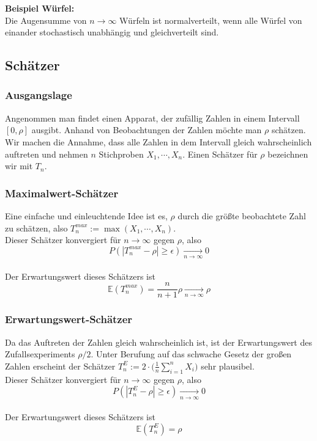\documentclass[a4paper]{article}
\begin{document}
\textbf{Beispiel Würfel:}\\
Die Augensumme von $n \to \infty$ Würfeln ist normalverteilt, wenn alle Würfel von einander stochastisch unabhängig und gleichverteilt sind.

\pagebreak
\subsection{Schätzer}

\subsubsection{Ausgangslage}
Angenommen man findet einen Apparat, der zufällig Zahlen in einem Intervall $[0, \rho]$ ausgibt. Anhand von Beobachtungen der Zahlen möchte man $\rho$ schätzen. Wir machen die Annahme, dass alle Zahlen in dem Intervall gleich wahrscheinlich auftreten und  nehmen $n$ Stichproben $X_1, \cdots, X_n$. Einen Schätzer für $\rho$ bezeichnen wir mit $T_n$.

\subsubsection{Maximalwert-Schätzer}
Eine einfache und einleuchtende Idee ist es, $\rho$ durch die größte beobachtete Zahl zu schätzen, also
$T_n^{max} := \max(X_1, \cdots, X_n)$.\\
Dieser Schätzer konvergiert für $n \to \infty$ gegen $\rho$, also $$P(| T_n^{max} - \rho | \geq \epsilon) \underset{n \to \infty}{\longrightarrow} 0$$\\
Der Erwartungswert dieses Schätzers ist $$ \mathbb{E}(T_n^{max} ) = \frac{n}{n+1} \rho    \underset{n \to \infty}{\longrightarrow} \rho$$


\subsubsection{Erwartungswert-Schätzer}
Da das Auftreten der Zahlen gleich wahrscheinlich ist, ist der Erwartungswert des Zufallsexperiments $\rho /2$. Unter Berufung auf das  schwache Gesetz der großen Zahlen erscheint der Schätzer
$T_n^{E} :=  2 \cdot \biggl( \frac{1}{n} \sum_{i=1}^n X_i \biggr)$ sehr plausibel.\\
Dieser Schätzer konvergiert für $n \to \infty$ gegen $\rho$, also $$P(| T_n^{E} - \rho | \geq \epsilon) \underset{n \to \infty}{\longrightarrow} 0$$\\
Der Erwartungswert dieses Schätzers ist $$ \mathbb{E}(T_n^{E} ) = \rho$$
\end{document}
